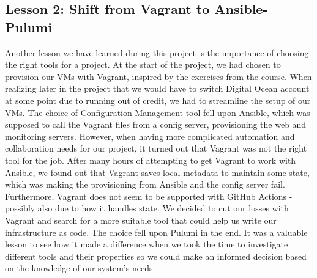 \subsection{Lesson 2: Shift from Vagrant to Ansible-Pulumi}
Another lesson we have learned during this project is the importance of choosing the right tools for a project.
At the start of the project, we had chosen to provision our VMs with Vagrant, inspired by the exercises from the course.
When realizing later in the project that we would have to switch Digital Ocean account at some point due to running out of credit, we had to streamline the setup of our VMs.
The choice of Configuration Management tool fell upon Ansible, which was supposed to call the Vagrant files from a config server, provisioning the web and monitoring servers.
However, when having more complicated automation and collaboration needs for our project, it turned out that Vagrant was not the right tool for the job.
After many hours of attempting to get Vagrant to work with Ansible, we found out that Vagrant saves local metadata to maintain some state, which was making the provisioning from Ansible and the config server fail\cite{issue178-vagrant-ansible}. Furthermore, Vagrant does not seem to be supported with GitHub Actions - possibly also due to how it handles state.
We decided to cut our losses with Vagrant and search for a more suitable tool that could help us write our infrastructure as code.
The choice fell upon Pulumi in the end.
It was a valuable lesson to see how it made a difference when we took the time to investigate different tools and their properties so we could make an informed decision based on the knowledge of our system's needs.
